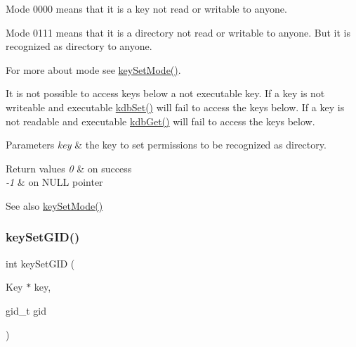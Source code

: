 \begin{DoxyItemize}
\item Mode 0000 means that it is a key not read or writable to anyone.
\item Mode 0111 means that it is a directory not read or writable to anyone. But it is recognized as directory to anyone.
\end{DoxyItemize}

For more about mode see \mbox{\hyperlink{group__meta_ga8803037e35b9da1ce492323a88ff6bc3}{key\+Set\+Mode()}}.

It is not possible to access keys below a not executable key. If a key is not writeable and executable \mbox{\hyperlink{group__kdb_ga11436b058408f83d303ca5e996832bcf}{kdb\+Set()}} will fail to access the keys below. If a key is not readable and executable \mbox{\hyperlink{group__kdb_ga28e385fd9cb7ccfe0b2f1ed2f62453a1}{kdb\+Get()}} will fail to access the keys below.


\begin{DoxyParams}{Parameters}
{\em key} & the key to set permissions to be recognized as directory. \\
\hline
\end{DoxyParams}

\begin{DoxyRetVals}{Return values}
{\em 0} & on success \\
\hline
{\em -\/1} & on N\+U\+LL pointer \\
\hline
\end{DoxyRetVals}
\begin{DoxySeeAlso}{See also}
\mbox{\hyperlink{group__meta_ga8803037e35b9da1ce492323a88ff6bc3}{key\+Set\+Mode()}} 
\end{DoxySeeAlso}
\mbox{\label{group__meta_ga9e3d0fb3f7ba906e067727b9155d22e3}} 
\subsubsection{\texorpdfstring{keySetGID()}{keySetGID()}}
{\footnotesize\ttfamily int key\+Set\+G\+ID (\begin{DoxyParamCaption}\item[{Key $\ast$}]{key,  }\item[{gid\+\_\+t}]{gid }\end{DoxyParamCaption})}



